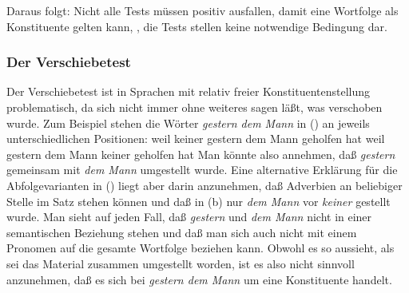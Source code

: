 Daraus folgt: Nicht alle Tests müssen positiv ausfallen, damit eine Wortfolge als Konstituente gelten kann,
\dash, die Tests stellen keine notwendige Bedingung dar.




\subsubsection{Der Verschiebetest}

Der Verschiebetest ist in Sprachen mit relativ freier Konstituentenstellung problematisch, da sich
nicht immer ohne weiteres sagen läßt, was verschoben wurde. Zum Beispiel stehen die Wörter
\emph{gestern dem Mann} in () an jeweils unterschiedlichen Positionen:
\eal
\ex weil keiner gestern dem Mann geholfen hat
\ex weil gestern dem Mann keiner geholfen hat
\zl
Man könnte also annehmen, daß \emph{gestern} gemeinsam mit \emph{dem Mann} umgestellt wurde. Eine
alternative Erklärung für die Abfolgevarianten in () liegt aber darin anzunehmen, daß
Adverbien an beliebiger Stelle im Satz stehen können und daß in (b) nur \emph{dem Mann} vor
\emph{keiner} gestellt wurde. Man sieht auf jeden Fall, daß \emph{gestern} und \emph{dem Mann} nicht
in einer semantischen Beziehung stehen und daß man sich auch nicht mit einem Pronomen auf die
gesamte Wortfolge beziehen kann. Obwohl es so aussieht, als sei das Material zusammen umgestellt
worden, ist es also nicht sinnvoll anzunehmen, daß es sich bei \emph{gestern dem Mann} um eine
Konstituente handelt.

